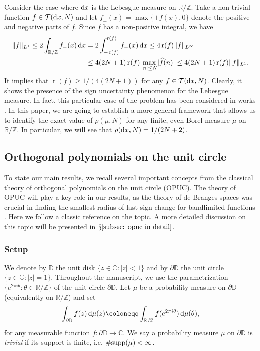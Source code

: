 \documentclass[reqno, a4paper]{amsart}
\def\C{\mathbb{C}}
\def\T{\mathbb{R}/\mathbb{Z}}
\def\supp{{\rm supp}}
\renewcommand{\d}{\text{\rm d}}
\newcommand{\dD}{\partial\mathbb{D}}
\renewcommand{\r}{\operatorname{r}}
\theoremstyle{plain}
\theoremstyle{definition}
\theoremstyle{remarkstyle}
\numberwithin{equation}{section}
\begin{document}
Consider the case where $\d x$ is the Lebesgue measure on $\T$. Take a non-trivial function $f\in \mathcal{T}(\d x , N)$ and let $f_{\pm}(x)=\max\{\pm f(x), 0\}$ denote the positive and negative parts of $f$. Since $f$ has a non-positive integral, we have
\begin{equation*}
\begin{split}
\lVert f\rVert_{L^1}\leq  2\int_{\T}f_{-}(x)\, \d x&=2\int_{-\r(f)}^{\r(f)} f_{-}(x)\,\d x\leq 4 \r(f) \lVert f\rVert_{L^\infty}\\
&\leq 4(2N+1) \r(f) \max_{|n|\leq N} \lvert \widehat{f}(n)\rvert \leq 4(2N+1) \r(f)  \lVert f\rVert_{L^1}.
\end{split}
\end{equation*}
It implies that $\r(f)\geq 1/(4(2N+1))$ for any $f\in \mathcal{T}(\d x, N)$. Clearly, it shows the presence of the sign uncertainty phenomenon for the Lebesgue measure. In fact, this particular case of the problem has been considered in works \cite{Babenko1984ExtremalProblemPolynomials, YudinTwoExternalProblemsTrigonometric1996}.  In this paper, we are going to establish a more general framework that allows us to identify the exact value of $\rho(\mu, N)$ for any finite, even Borel measure $\mu$ on $\T$. In particular, we will see that $\rho(\d x, N)=1/(2N+2)$.




\medskip

\subsection{Orthogonal polynomials on the unit circle}\label{subsec: opuc basics}
To state our main results, we recall several important concepts from the classical theory of orthogonal polynomials on the unit circle (OPUC). The theory of OPUC will play a key role in our results, as the theory of de Branges spaces \cite{deBranges1968-HilbertSpacesOfEntireFunctions} was crucial in finding the smallest radius of last sign change for bandlimited functions \cite{Carneiro2024SignUncertaintyBrangesSpaces}. Here we follow a classic reference \cite{SimonPart1OrthogonalPolynomialsUnitCircle2005} on the topic. A more detailed discussion on this topic will be presented in $\mathsection \ref{subsec: opuc in detail}$.

\subsubsection{Setup} We denote by $\mathbb{D}$ the unit disk $\{z\in \C: |z|<1\}$ and by $\dD$ the unit circle $\{z\in \C: |z|=1\}$. Throughout the manuscript, we use the parametrization $\{e^{2\pi i \theta}: \theta \in \T\}$ of the unit circle $\dD$. Let $\mu$ be a probability measure on $\dD$ (equivalently on $\T$) and set
\begin{equation*}
    \int_{\dD} f(z)\,\d\mu(z)\coloneqq \int_{\T} f(e^{2\pi i \theta}) \,\d\mu(\theta),
\end{equation*}
for any measurable function $f:\dD\to \C$. We say a probability measure $\mu$ on $\dD$ is \emph{trivial} if its support is finite, i.e.  $\#\supp(\mu)<\infty$. 
\end{document}
